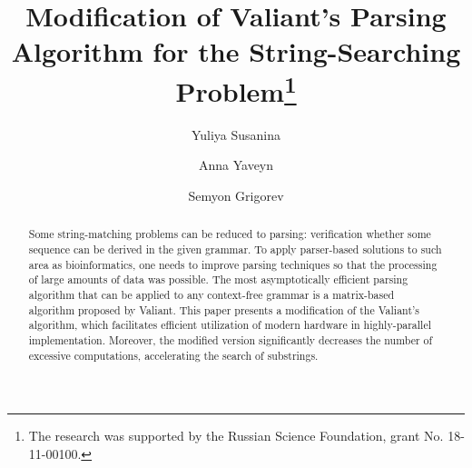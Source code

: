 \documentclass[runningheads]{llncs}
\begin{document}
%
\title{Modification of Valiant's Parsing Algorithm for the String-Searching Problem\thanks{The research was supported by the Russian Science Foundation, grant No. 18-11-00100.}}
%
%
\author{Yuliya Susanina \and
Anna Yaveyn \and
Semyon Grigorev}
%
%
%
\maketitle              %
%
\begin{abstract}
Some string-matching problems can be reduced to parsing: verification whether some sequence can be derived in the given grammar. 
To apply parser-based solutions to such area as bioinformatics, one needs to improve parsing techniques so that the processing of large amounts of data was possible.
The most asymptotically efficient parsing algorithm that can be applied to any context-free grammar is a matrix-based algorithm proposed by Valiant.
This paper presents a modification of the Valiant’s algorithm, which facilitates efficient utilization of modern hardware in highly-parallel implementation. 
Moreover, the modified version significantly decreases the number of excessive computations, accelerating the search of substrings.

\end{abstract}
%
%
%







%


\end{document}
